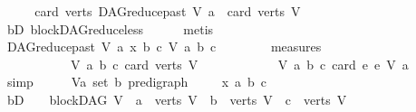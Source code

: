 \begin{isabellebody}
\ \ \isamarkupfalse%
\ \isamarkupfalse%
\ {\isachardoublequoteopen}card\ {\isacharparenleft}{\kern0pt}verts\ {\isacharparenleft}{\kern0pt}DAG{\isachardot}{\kern0pt}reduce{\isacharunderscore}{\kern0pt}past\ V\ a{\isacharparenright}{\kern0pt}{\isacharparenright}{\kern0pt}\ {\isacharless}{\kern0pt}\ card\ {\isacharparenleft}{\kern0pt}verts\ V{\isacharparenright}{\kern0pt}{\isachardoublequoteclose}\ \ \ \isanewline
\ \ \ \ \isamarkupfalse%
\ bD\ blockDAG{\isachardot}{\kern0pt}reduce{\isacharunderscore}{\kern0pt}less\isanewline
\ \ \ \ \isamarkupfalse%
\ metis\isanewline
\ \ \isamarkupfalse%
\ \isamarkupfalse%
\ {\isachardoublequoteopen}{\isacharparenleft}{\kern0pt}{\isacharparenleft}{\kern0pt}DAG{\isachardot}{\kern0pt}reduce{\isacharunderscore}{\kern0pt}past\ V\ a{\isacharcomma}{\kern0pt}\ x{\isacharcomma}{\kern0pt}\ b{\isacharcomma}{\kern0pt}\ c{\isacharparenright}{\kern0pt}{\isacharcomma}{\kern0pt}\ V{\isacharcomma}{\kern0pt}\ a{\isacharcomma}{\kern0pt}\ b{\isacharcomma}{\kern0pt}\ c{\isacharparenright}{\kern0pt}\isanewline
\ \ \ \ \ \ \ {\isasymin}\ measures\isanewline
\ \ \ \ \ \ \ \ \ \ \ {\isacharbrackleft}{\kern0pt}{\isasymlambda}{\isacharparenleft}{\kern0pt}V{\isacharcomma}{\kern0pt}\ a{\isacharcomma}{\kern0pt}\ b{\isacharcomma}{\kern0pt}\ c{\isacharparenright}{\kern0pt}{\isachardot}{\kern0pt}\ card\ {\isacharparenleft}{\kern0pt}verts\ V{\isacharparenright}{\kern0pt}{\isacharcomma}{\kern0pt}\isanewline
\ \ \ \ \ \ \ \ \ \ \ \ {\isasymlambda}{\isacharparenleft}{\kern0pt}V{\isacharcomma}{\kern0pt}\ a{\isacharcomma}{\kern0pt}\ b{\isacharcomma}{\kern0pt}\ c{\isacharparenright}{\kern0pt}{\isachardot}{\kern0pt}\ card\ {\isacharbraceleft}{\kern0pt}e{\isachardot}{\kern0pt}\ e\ {\isasymrightarrow}\isactrlsup {\isacharasterisk}{\kern0pt}\isactrlbsub V\isactrlesub \ a{\isacharbraceright}{\kern0pt}{\isacharbrackright}{\kern0pt}{\isachardoublequoteclose}\isanewline
\ \ \ \ \isamarkupfalse%
\ simp\isanewline
{}\isamarkupfalse%
\ \isanewline
\ \ \isamarkupfalse%
\ V{\isacharcolon}{\kern0pt}{\isacharcolon}{\kern0pt}{\isachardoublequoteopen}{\isacharparenleft}{\kern0pt}{\isacharprime}{\kern0pt}a\ set{\isacharcomma}{\kern0pt}\ {\isacharprime}{\kern0pt}b{\isacharparenright}{\kern0pt}\ pre{\isacharunderscore}{\kern0pt}digraph{\isachardoublequoteclose}\ \isanewline
\ \ \isamarkupfalse%
\ x\ a\ b\ c\isanewline
\ \ \isamarkupfalse%
\ bD{\isacharcolon}{\kern0pt}\ {\isachardoublequoteopen}\ {\isasymnot}\ {\isacharparenleft}{\kern0pt}{\isasymnot}\ blockDAG\ V\ {\isasymor}\ a\ {\isasymnotin}\ verts\ V\ {\isasymor}\ b\ {\isasymnotin}\ verts\ V\ {\isasymor}\ c\ {\isasymnotin}\ verts\ V{\isacharparenright}{\kern0pt}{\isachardoublequoteclose}\isanewline

\end{isabellebody}
